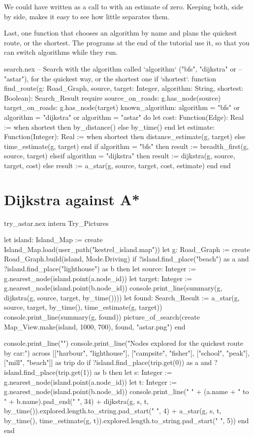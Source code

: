 We could have written  as a call to  with an
estimate of zero. Keeping both, side by side, makes it easy to see how
little separates them.

Last, one function that chooses an algorithm by name and plans the
quickest route, or the shortest. The programs at the end of the tutorial
use it, so that you can switch algorithms while they run.

\begin{append}{search.nex}
-- Search with the algorithm called `algorithm` ("bfs", "dijkstra" or
-- "astar"), for the quickest way, or the shortest one if `shortest`.
function find_route(g: Road_Graph, source, target: Integer, algorithm: String,
  shortest: Boolean): Search_Result
require
  source_on_roads: g.has_node(source)
  target_on_roads: g.has_node(target)
  known_algorithm: algorithm = "bfs" or algorithm = "dijkstra" or algorithm = "astar"
do
  let cost: Function(Edge): Real := when shortest then by_distance() else by_time() end
  let estimate: Function(Integer): Real :=
    when shortest then distance_estimate(g, target) else time_estimate(g, target) end
  if algorithm = "bfs" then
    result := breadth_first(g, source, target)
  elseif algorithm = "dijkstra" then
    result := dijkstra(g, source, target, cost)
  else
    result := a_star(g, source, target, cost, estimate)
  end
end
\end{append}

\section{Dijkstra against A*}

\begin{tryit}{try_astar.nex}
intern Try_Pictures

let island: Island_Map := create Island_Map.load(user_path("kestrel_island.map"))
let g: Road_Graph := create Road_Graph.build(island, Mode.Driving)
if ?island.find_place("beach") as a and ?island.find_place("lighthouse") as b then
  let source: Integer := g.nearest_node(island.point(a.node_id))
  let target: Integer := g.nearest_node(island.point(b.node_id))
  console.print_line(summary(g, dijkstra(g, source, target, by_time())))
  let found: Search_Result := a_star(g, source, target, by_time(), time_estimate(g, target))
  console.print_line(summary(g, found))
  picture_of_search(create Map_View.make(island, 1000, 700), found, "astar.png")
end

console.print_line("")
console.print_line("Nodes explored for the quickest route by car:")
across [["harbour", "lighthouse"], ["campsite", "fisher"], ["school", "peak"],
    ["mill", "beach"]] as trip do
  if ?island.find_place(trip.get(0)) as a and ?island.find_place(trip.get(1)) as b then
    let s: Integer := g.nearest_node(island.point(a.node_id))
    let t: Integer := g.nearest_node(island.point(b.node_id))
    console.print_line("  " + (a.name + " to " + b.name).pad_end(" ", 34)
      + dijkstra(g, s, t, by_time()).explored.length.to_string.pad_start(" ", 4)
      + a_star(g, s, t, by_time(), time_estimate(g, t)).explored.length.to_string.pad_start(" ", 5))
  end
end
\end{tryit}

